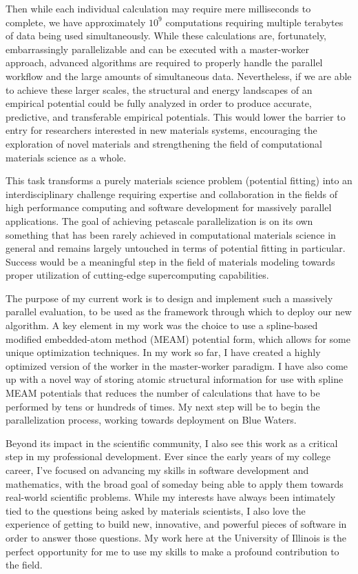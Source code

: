 \documentclass[11pt]{article}
\begin{document}
\noindent Then while each individual calculation may require mere milliseconds to complete, we have approximately $10^9$ computations requiring multiple terabytes of data being used simultaneously. While these calculations are, fortunately, embarrassingly parallelizable and can be executed with a master-worker approach, advanced algorithms are required to properly handle the parallel workflow and the large amounts of simultaneous data. Nevertheless, if we are able to achieve these larger scales, the structural and energy landscapes of an empirical potential could be fully analyzed in order to produce accurate, predictive, and transferable empirical potentials. This would lower the barrier to entry for researchers interested in new materials systems, encouraging the exploration of novel materials and strengthening the field of computational materials science as a whole.

This task transforms a purely materials science problem (potential fitting) into an interdisciplinary challenge requiring expertise and collaboration in the fields of high performance computing and software development for massively parallel applications. The goal of achieving petascale parallelization is on its own something that has been rarely achieved in computational materials science in general and remains largely untouched in terms of potential fitting in particular. Success would be a meaningful step in the field of materials modeling towards proper utilization of cutting-edge supercomputing capabilities.

The purpose of my current work is to design and implement such a massively parallel evaluation, to be used as the framework through which to deploy our new algorithm. A key element in my work was the choice to use a spline-based modified embedded-atom method (MEAM) potential form, which allows for some unique optimization techniques. In my work so far, I have created a highly optimized version of the worker in the master-worker paradigm. I have also come up with a novel way of storing atomic structural information for use with spline MEAM potentials that reduces the number of calculations that have to be performed by tens or hundreds of times. My next step will be to begin the parallelization process, working towards deployment on Blue Waters.

Beyond its impact in the scientific community, I also see this work as a critical step in my professional development. Ever since the early years of my college career, I've focused on advancing my skills in software development and mathematics, with the broad goal of someday being able to apply them towards real-world scientific problems. While my interests have always been intimately tied to the questions being asked by materials scientists, I also love the experience of getting to build new, innovative, and powerful pieces of software in order to answer those questions. My work here at the University of Illinois is the perfect opportunity for me to use my skills to make a profound contribution to the field.
\end{document}
